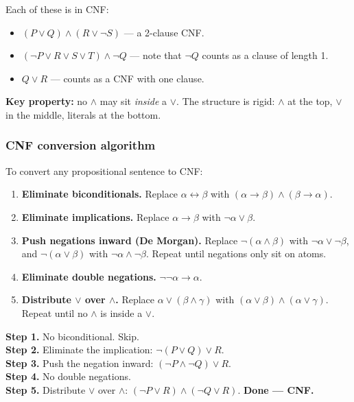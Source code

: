 \documentclass[11pt, a4paper]{article}
\begin{document}
Each of these is in CNF:
\begin{itemize}
  \item $(P \lor Q) \land (R \lor \neg S)$ — a 2-clause CNF.
  \item $(\neg P \lor R \lor S \lor T) \land \neg Q$ — note that $\neg Q$ counts as a clause of length 1.
  \item $Q \lor R$ — counts as a CNF with one clause.
\end{itemize}

\textbf{Key property:} no $\land$ may sit \emph{inside} a $\lor$. The structure is rigid: $\land$ at the top, $\lor$ in the middle, literals at the bottom.

\subsubsection*{CNF conversion algorithm}

To convert any propositional sentence to CNF:

\begin{enumerate}
  \item \textbf{Eliminate biconditionals.} Replace $\alpha \leftrightarrow \beta$ with $(\alpha \rightarrow \beta) \land (\beta \rightarrow \alpha)$.
  \item \textbf{Eliminate implications.} Replace $\alpha \rightarrow \beta$ with $\neg \alpha \lor \beta$.
  \item \textbf{Push negations inward (De Morgan).} Replace $\neg(\alpha \land \beta)$ with $\neg\alpha \lor \neg\beta$, and $\neg(\alpha \lor \beta)$ with $\neg\alpha \land \neg\beta$. Repeat until negations only sit on atoms.
  \item \textbf{Eliminate double negations.} $\neg\neg\alpha \to \alpha$.
  \item \textbf{Distribute $\lor$ over $\land$.} Replace $\alpha \lor (\beta \land \gamma)$ with $(\alpha \lor \beta) \land (\alpha \lor \gamma)$. Repeat until no $\land$ is inside a $\lor$.
\end{enumerate}

\begin{exbox}
\textbf{Step 1.} No biconditional. Skip.\\[0.3em]
\textbf{Step 2.} Eliminate the implication: $\neg(P \lor Q) \lor R$.\\[0.3em]
\textbf{Step 3.} Push the negation inward: $(\neg P \land \neg Q) \lor R$.\\[0.3em]
\textbf{Step 4.} No double negations.\\[0.3em]
\textbf{Step 5.} Distribute $\lor$ over $\land$: $(\neg P \lor R) \land (\neg Q \lor R)$. \textbf{Done — CNF.}
\end{exbox}
\end{document}
